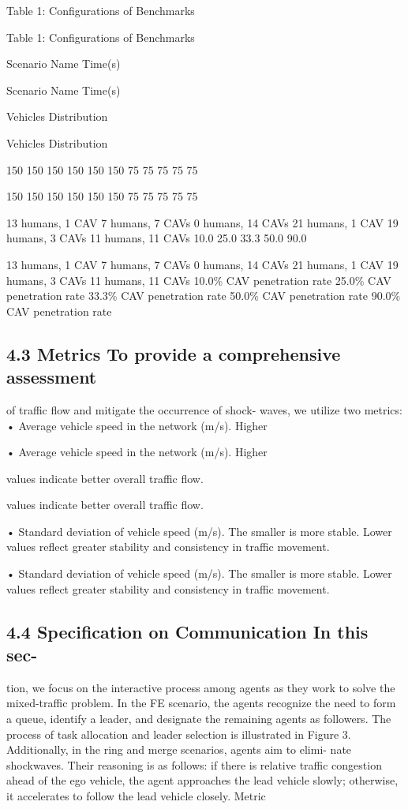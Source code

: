 \documentclass[12pt]{article}
\begin{document}
Table 1: Configurations of Benchmarks


Table 1: Configurations of Benchmarks


Scenario Name Time(s)


Scenario Name Time(s)


Vehicles Distribution


Vehicles Distribution


150
150
150
150
150
150
75
75
75
75
75


150
150
150
150
150
150
75
75
75
75
75


13 humans, 1 CAV
7 humans, 7 CAVs
0 humans, 14 CAVs
21 humans, 1 CAV
19 humans, 3 CAVs
11 humans, 11 CAVs
10.0%
25.0%
33.3%
50.0%
90.0%


13 humans, 1 CAV
7 humans, 7 CAVs
0 humans, 14 CAVs
21 humans, 1 CAV
19 humans, 3 CAVs
11 humans, 11 CAVs
10.0\% CAV penetration rate
25.0\% CAV penetration rate
33.3\% CAV penetration rate
50.0\% CAV penetration rate
90.0\% CAV penetration rate


\subsection{4.3 Metrics To provide a comprehensive assessment}

of traffic flow and mitigate the occurrence of shock-
waves, we utilize two metrics:
• Average vehicle speed in the network (m/s). Higher


• Average vehicle speed in the network (m/s). Higher


values indicate better overall traffic flow.


values indicate better overall traffic flow.


• Standard deviation of vehicle speed (m/s). The
smaller is more stable. Lower values reflect greater
stability and consistency in traffic movement.


• Standard deviation of vehicle speed (m/s). The
smaller is more stable. Lower values reflect greater
stability and consistency in traffic movement.


\subsection{4.4 Specification on Communication In this sec-}

tion, we focus on the interactive process among agents
as they work to solve the mixed-traffic problem. In the
FE scenario, the agents recognize the need to form a
queue, identify a leader, and designate the remaining
agents as followers. The process of task allocation and
leader selection is illustrated in Figure 3. Additionally,
in the ring and merge scenarios, agents aim to elimi-
nate shockwaves. Their reasoning is as follows: if there
is relative traffic congestion ahead of the ego vehicle, the
agent approaches the lead vehicle slowly; otherwise, it
accelerates to follow the lead vehicle closely.
Metric
\end{document}
